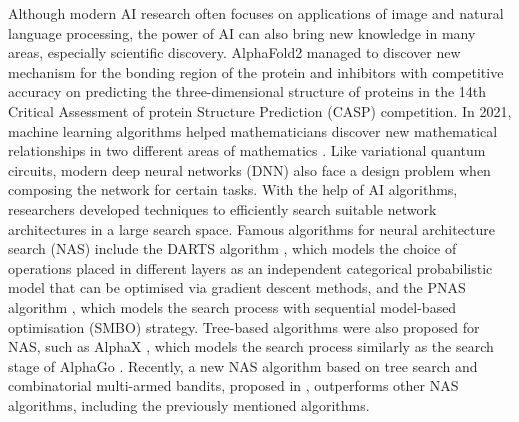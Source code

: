 \documentclass[a4paper,onecolumn,11pt]{quantumarticle}
\begin{document}
Although modern AI research often focuses on applications of image and natural language processing, the power of AI can also bring new knowledge in many areas, especially scientific discovery. 
AlphaFold2 managed to discover new mechanism for the bonding region of the protein and inhibitors \cite{alphafold2Jumper2021-lw} with competitive accuracy on predicting the three-dimensional structure of proteins in the 14th Critical Assessment of protein Structure Prediction (CASP) competition. In 2021, machine learning algorithms helped mathematicians discover new mathematical relationships in two different areas of mathematics \cite{Davies2021-xh}. Like variational quantum circuits, modern deep neural networks (DNN) also face a design problem when composing the network for certain tasks. With the help of AI algorithms, researchers developed techniques to efficiently search suitable network architectures in a large search space. Famous algorithms for neural architecture search (NAS) include the DARTS algorithm \cite{DARTS_DBLP:conf/iclr/LiuSY19}, which models the choice of operations placed in different layers as an independent categorical probabilistic model that can be optimised via gradient descent methods, and the PNAS algorithm \cite{PNAS10.1007/978-3-030-01246-5_2}, which models the search process with sequential model-based optimisation (SMBO) strategy. %
Tree-based algorithms were also proposed for NAS, such as AlphaX \cite{AlphaXDBLP:conf/aaai/WangZJTF20}, which models the search process similarly as the search stage of AlphaGo \cite{AlphaGoDBLP:journals/nature/SilverHMGSDSAPL16}. Recently, a new NAS algorithm based on tree search and combinatorial multi-armed bandits, proposed in \cite{huang2021neural}, outperforms other NAS algorithms, including the previously mentioned algorithms.
\end{document}
